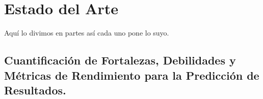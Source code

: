 \section{Estado del Arte}


Aquí lo divimos en partes así cada uno pone lo suyo.


\subsection{Cuantificación de Fortalezas, Debilidades y Métricas de Rendimiento para la Predicción de Resultados.}


